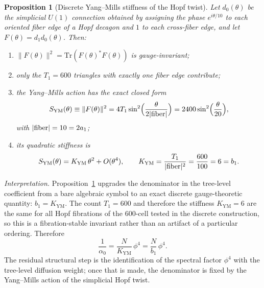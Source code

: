 \documentclass[12pt,a4paper]{article}
\newtheorem{proposition}{Proposition}
\theoremstyle{definition}
\begin{document}
\begin{proposition}[Discrete Yang--Mills stiffness of the Hopf twist]\label{prop:ym_stiffness}
Let $d_0(\theta)$ be the simplicial $U(1)$ connection obtained by assigning the phase $e^{i\theta/10}$ to each oriented fiber edge of a Hopf decagon and $1$ to each cross-fiber edge, and let $F(\theta) = d_1 d_0(\theta)$.  Then:
\begin{enumerate}
\item[(i)] $\|F(\theta)\|^2 = \mathrm{Tr}(F(\theta)^*F(\theta))$ is gauge-invariant;
\item[(ii)] only the $T_1 = 600$ triangles with exactly one fiber edge contribute;
\item[(iii)] the Yang--Mills action has the exact closed form
\begin{equation}
S_{\mathrm{YM}}(\theta) \equiv \|F(\theta)\|^2 = 4T_1 \sin^2\!\Big(\frac{\theta}{2|{\rm fiber}|}\Big)
= 2400\sin^2\!\Big(\frac{\theta}{20}\Big),
\label{eq:sym_closed}
\end{equation}
with $|{\rm fiber}| = 10 = 2a_1$;
\item[(iv)] its quadratic stiffness is
\begin{equation}
S_{\mathrm{YM}}(\theta) = K_{\mathrm{YM}}\,\theta^2 + O(\theta^4),
\qquad
K_{\mathrm{YM}} = \frac{T_1}{|{\rm fiber}|^2} = \frac{600}{100} = 6 = b_1.
\label{eq:kym_b1}
\end{equation}
\end{enumerate}
\end{proposition}

\noindent\textit{Interpretation.}  Proposition~\ref{prop:ym_stiffness} upgrades the denominator in the tree-level coefficient from a bare algebraic symbol to an exact discrete gauge-theoretic quantity: $b_1 = K_{\mathrm{YM}}$.  The count $T_1 = 600$ and therefore the stiffness $K_{\mathrm{YM}} = 6$ are the same for all Hopf fibrations of the 600-cell tested in the discrete construction, so this is a fibration-stable invariant rather than an artifact of a particular ordering.  Therefore
\begin{equation}
\frac{1}{\alpha_0} = \frac{N}{K_{\mathrm{YM}}}\,\phi^4 = \frac{N}{b_1}\,\phi^4.
\label{eq:alpha0_kym}
\end{equation}
The residual structural step is the identification of the spectral factor $\phi^4$ with the tree-level diffusion weight; once that is made, the denominator is fixed by the Yang--Mills action of the simplicial Hopf twist.
\end{document}
